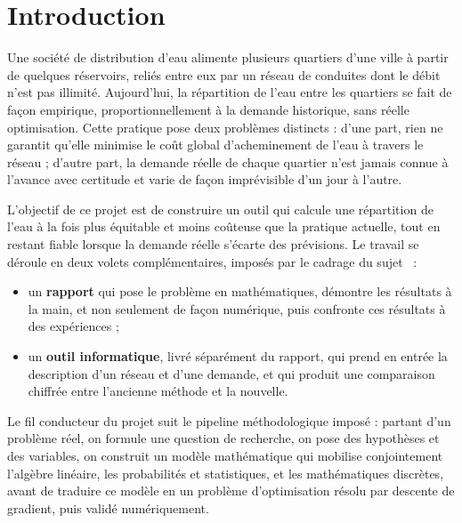 \documentclass[11pt]{ama-article}
\affiliation{a}{Académie des Mathématiques Appliquées, Cotonou, Bénin}
\begin{document}
\maketitle

\section{Introduction}

Une société de distribution d'eau alimente plusieurs quartiers d'une ville à partir de
quelques réservoirs, reliés entre eux par un réseau de conduites dont le débit n'est pas
illimité. Aujourd'hui, la répartition de l'eau entre les quartiers se fait de façon empirique,
proportionnellement à la demande historique, sans réelle optimisation. Cette pratique pose
deux problèmes distincts : d'une part, rien ne garantit qu'elle minimise le coût global
d'acheminement de l'eau à travers le réseau ; d'autre part, la demande réelle de chaque
quartier n'est jamais connue à l'avance avec certitude et varie de façon imprévisible d'un
jour à l'autre.

L'objectif de ce projet est de construire un outil qui calcule une répartition de l'eau à la
fois plus équitable et moins coûteuse que la pratique actuelle, tout en restant fiable
lorsque la demande réelle s'écarte des prévisions. Le travail se déroule en deux volets
complémentaires, imposés par le cadrage du sujet~\cite{sujets-ama} :

\begin{itemize}[leftmargin=*]
    \item un \textbf{rapport} qui pose le problème en mathématiques, démontre les résultats
    à la main, et non seulement de façon numérique, puis confronte ces résultats à des
    expériences ;
    \item un \textbf{outil informatique}, livré séparément du rapport, qui prend en entrée la
    description d'un réseau et d'une demande, et qui produit une comparaison chiffrée entre
    l'ancienne méthode et la nouvelle.
\end{itemize}

Le fil conducteur du projet suit le pipeline méthodologique imposé :
partant d'un problème réel, on formule une question de recherche, on pose des hypothèses et des
variables, on construit un modèle mathématique qui mobilise conjointement l'algèbre linéaire,
les probabilités et statistiques, et les mathématiques discrètes, avant de traduire ce modèle
en un problème d'optimisation résolu par descente de gradient, puis validé numériquement.
\end{document}
